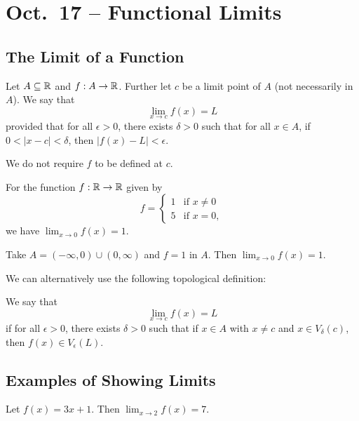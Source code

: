 \chapter{Oct.~17 -- Functional Limits}

\section{The Limit of a Function}
\begin{definition}
  Let $A \subseteq \mathbb{R}$ and $f : A \to \mathbb{R}$. Further let
  $c$ be a limit point of $A$ (not necessarily in $A$).
  We say that
  \[\lim_{x \to c} f(x) = L\]
  provided that for all $\epsilon > 0$, there exists
  $\delta > 0$ such that for all $x \in A$, if
  $0 < |x - c| < \delta$, then
  $|f(x) - L| < \epsilon$.
\end{definition}

\begin{remark}
  We do not require $f$ to be defined at $c$.
\end{remark}

\begin{example}
  For the function $f : \mathbb{R} \to \mathbb{R}$ given by
  \[
    f = \begin{cases}
      1 & \text{if $x \ne 0$} \\
      5 & \text{if $x = 0$},
    \end{cases}
  \]
  we have $\lim_{x \to 0} f(x) = 1$.
\end{example}

\begin{example}
  Take $A = (-\infty, 0) \cup (0, \infty)$ and $f = 1$
  in $A$. Then $\lim_{x \to 0} f(x) = 1$.
\end{example}

We can alternatively use the following topological
definition:
\begin{definition}
  We say that
  \[\lim_{x \to c}f(x) = L\]
  if for all $\epsilon > 0$, there exists $\delta > 0$
  such that if $x \in A$ with $x \ne c$ and
  $x \in V_\delta(c)$, then $f(x) \in V_\epsilon(L)$.
\end{definition}

\section{Examples of Showing Limits}
\begin{exercise}
  Let $f(x) = 3x + 1$. Then $\lim_{x \to 2} f(x) = 7$.
\end{exercise}


